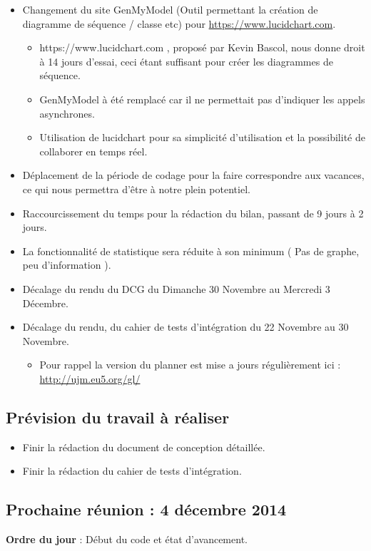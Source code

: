\documentclass[12pt,a4paper]{article}
\begin{document}
\begin{itemize}[label = $\ast$]
	\item Changement du site GenMyModel (Outil permettant la création de diagramme de séquence / classe etc)  pour \url{https://www.lucidchart.com}.
	\begin{itemize}[label = $\circ$]
		\item https://www.lucidchart.com , proposé par Kevin Bascol, nous donne droit à 14 jours d'essai, ceci étant suffisant pour créer les diagrammes de séquence.
		\item GenMyModel à été remplacé car il ne permettait pas d'indiquer les appels asynchrones.
		\item Utilisation de lucidchart pour sa simplicité d'utilisation et la possibilité de collaborer en temps réel.
	\end{itemize}
	\item Déplacement de la période de codage pour la faire correspondre aux vacances, ce qui nous permettra d'être à notre plein potentiel.
	\item Raccourcissement du temps pour la rédaction du bilan, passant de 9 jours à 2 jours.
	\item La fonctionnalité de statistique sera réduite à son minimum ( Pas de graphe, peu d'information ).
	\item Décalage du rendu du DCG du Dimanche 30 Novembre au Mercredi 3 Décembre.
	\item Décalage du rendu, du cahier de tests d'intégration du 22 Novembre au 30 Novembre.
	\begin{itemize}[label = $\circ$]
		\item Pour rappel la version du planner est mise a jours régulièrement ici : \url{http://ujm.eu5.org/gl/}
	\end{itemize}
\end{itemize}

\subsection*{Prévision du travail à réaliser}

\begin{itemize}[label = $\ast$]
	\item Finir la rédaction du document de conception détaillée.
	\item Finir la rédaction du cahier de tests d'intégration.
\end{itemize}

\subsection*{Prochaine réunion : 4 décembre 2014}

\textbf{Ordre du jour} : Début du code et état d'avancement.\\
\end{document}
